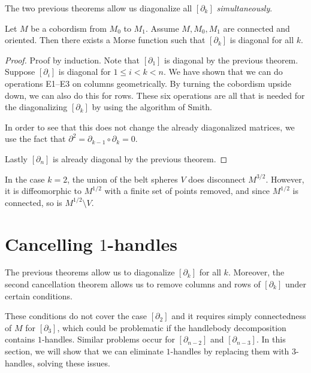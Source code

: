 The two previous theorems allow us diagonalize all $[\partial_k]$ \emph{simultaneously}.
\begin{theorem}
    Let $M$ be a cobordism from  $ M_0$ to $M_{1}$.
    Assume $M, M_0, M_1$ are connected and oriented.
    Then there exists a Morse function such that $[\partial_k]$ is diagonal for all $k$.
\end{theorem}


\begin{proof}
    Proof by induction.
    Note that $[\partial_1]$ is diagonal by the previous theorem.
    Suppose $[\partial_i]$ is diagonal for  $1 \le  i < k < n$.
    We have shown that we can do operations E1--E3 on columns geometrically.
    By turning the cobordism upside down, we can also do this for rows.
    These six operations are all that is needed for the diagonalizing $[\partial_k]$ by using the algorithm of Smith.

    In order to see that this does not change the already diagonalized matrices, we use the fact that $\partial^2 = \partial_{k-1} \circ \partial_{k} = 0$.

    Lastly $[\partial_n]$ is already diagonal by the previous theorem.
\end{proof}

\begin{marginfigure}
    \centering
    \caption{In the case $k = 2$, the union of the belt spheres $V$ does disconnect $M^{3 / 2}$. However, it is diffeomorphic to $M^{ 1 / 2}$ with a finite set of points removed, and since $M^{ 1 / 2}$ is connected, so is  $M^{ 1 / 2} \setminus V$.}
    \label{fig:proof-e1-e2-e3-disconnect-case}
\end{marginfigure}


\section{Cancelling $1$-handles}
The previous theorems allow us to diagonalize $[\partial_k]$ for all $k$.
Moreover, the second cancellation theorem allows us to remove columns and rows of $[\partial_k]$ under certain conditions.

These conditions do not cover the case $[\partial_2]$ and it requires simply connectedness of $M$ for  $[\partial_3]$, which could be problematic if the handlebody decomposition contains  $1$-handles.
Similar problems occur for $[\partial_{n-2}]$ and $[\partial_{n-3}]$.
In this section, we will show that we can eliminate $1$-handles by replacing them with $3$-handles, solving these issues.

